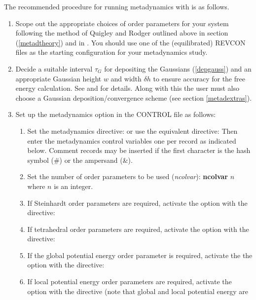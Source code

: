 The recommended procedure for running metadynamics with \D{} is as follows.
\begin{enumerate}
\item Scope out the appropriate choices of order parameters for your system
  following the method of Quigley and Rodger outlined above in section
  (\ref{metadtheory}) and in \cite{quigley-09a}. You should use one of the
  (equilibrated) REVCON files as the starting configuration for your
  metadynamics study.
\item Decide a suitable interval $\tau_{G}$ for depositing the Gaussians
  (\ref{depgauss}) and an appropriate Gaussian height $w$ and width $\delta h$
  to ensure accuracy for the free energy calculation. See \cite{laio-05a} and 
  \cite{quigley-09a} for details. Along with this the user must also choose a
  Gaussian deposition/convergence scheme (see section \ref{metadextras}).
\item Set up the metadynamics option in the CONTROL file as follows:
\begin{enumerate}
\item Set the metadynamics directive: \newline or
  use the equivalent directive: \newline Then
  enter the metadynamics control variables one per record as indicated below.
  Comment records may be inserted if the first character is the hash symbol
  (\#) or the ampersand (\&).
\item Set the number of order parameters to be used ({\em ncolvar}):\newline
  {\bf ncolvar} $n$ \newline where $n$ is an integer.
\item If Steinhardt order parameters are required, activate the option with
  the directive: 
\item If tetrahedral order parameters are required, activate the option with
  the directive: 
\item If the global potential energy order parameter is required, activate the
  the option with the directive: 
\item If local potential energy order parameters are required, activate the
  option with the directive (note that global and local potential energy are

\end{enumerate}
\end{enumerate}
